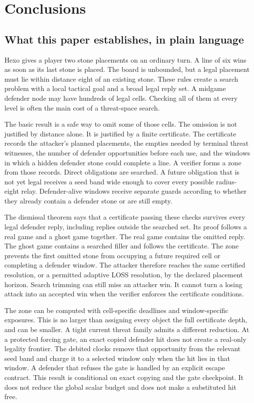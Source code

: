 \section{Conclusions}
\label{sec:conclusions}

\subsection{What this paper establishes, in plain language}

Hexo gives a player two stone placements on an ordinary turn.  A line of six
wins as soon as its last stone is placed.  The board is unbounded, but a legal
placement must lie within distance eight of an existing stone.  These rules
create a search problem with a local tactical goal and a broad legal reply
set.  A midgame defender node may have hundreds of legal cells.  Checking all
of them at every level is often the main cost of a threat-space search.

The basic result is a safe way to omit some of those cells.  The omission is
not justified by distance alone.  It is justified by a finite certificate.
The certificate records the attacker's planned placements, the empties needed
by terminal threat witnesses, the number of defender opportunities before
each use, and the windows in which a hidden defender stone could complete a
line.  A verifier forms a zone from those records.  Direct obligations are
searched.  A future obligation that is not yet legal receives a seed band
wide enough to cover every possible radius-eight relay.  Defender-alive
windows receive separate guards according to whether they already contain a
defender stone or are still empty.

The dismissal theorem says that a certificate passing these checks survives
every legal defender reply, including replies outside the searched set.  Its
proof follows a real game and a ghost game together.  The real game contains
the omitted reply.  The ghost game contains a searched filler and follows the
certificate.  The zone prevents the first omitted stone from occupying a
future required cell or completing a defender window.  The attacker therefore
reaches the same certified resolution, or a permitted adaptive LOSS
resolution, by the declared placement horizon.  Search trimming can still
miss an attacker win.  It cannot turn a losing attack into an accepted win
when the verifier enforces the certificate conditions.

The zone can be computed with cell-specific deadlines and window-specific
exposures.  This is no larger than assigning every object the full certificate
depth, and can be smaller.  A tight current threat family admits a different reduction.  At a
protected forcing gate, an exact copied defender hit does not create a
real-only legality frontier.  The debited clocks remove that opportunity from
the relevant seed band and charge it to a selected window only when the hit
lies in that window.  A defender that refuses the gate is handled by an
explicit escape contract.  This result is conditional on exact copying and
the gate checkpoint.  It does not reduce the global scalar budget and does
not make a substituted hit free.

